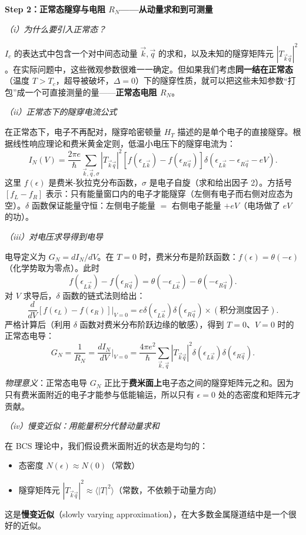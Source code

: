 \textbf{Step 2：正常态隧穿与电阻 $R_N$——从动量求和到可测量}

\textit{（i）为什么要引入正常态？}

$I_c$ 的表达式中包含一个对中间态动量 $\vec{k}, \vec{q}$ 的求和，以及未知的隧穿矩阵元 $|T_{\vec{k}\vec{q}}|^2$。在实际问题中，这些微观参数很难一一确定。但如果我们考虑\textbf{同一结在正常态}（温度 $T > T_c$，超导被破坏，$\Delta=0$）下的隧穿性质，就可以把这些未知参数``打包''成一个可直接测量的量——\textbf{正常态电阻 $R_N$}。

\textit{（ii）正常态下的隧穿电流公式}

在正常态下，电子不再配对，隧穿哈密顿量 $H_T$ 描述的是单个电子的直接隧穿。根据线性响应理论和费米黄金定则，低温小电压下的隧穿电流为：
\[
I_N(V) = \frac{2\pi e}{\hbar} \sum_{\vec{k},\vec{q},\sigma} |T_{\vec{k}\vec{q}}|^2 [f(\epsilon_{L\vec{k}}) - f(\epsilon_{R\vec{q}})] \delta(\epsilon_{L\vec{k}} - \epsilon_{R\vec{q}} - eV).
\]
这里 $f(\epsilon)$ 是费米-狄拉克分布函数，$\sigma$ 是电子自旋（求和给出因子 2）。方括号 $[f_L - f_R]$ 表示：只有能量窗口内的电子才能隧穿（左侧有电子而右侧对应态为空）。$\delta$ 函数保证能量守恒：左侧电子能量 $=$ 右侧电子能量 $+ eV$（电场做了 $eV$ 的功）。

\textit{（iii）对电压求导得到电导}

电导定义为 $G_N = dI_N/dV$。在 $T=0$ 时，费米分布是阶跃函数：$f(\epsilon) = \theta(-\epsilon)$（化学势取为零点）。此时
\[
f(\epsilon_{L\vec{k}}) - f(\epsilon_{R\vec{q}}) = \theta(-\epsilon_{L\vec{k}}) - \theta(-\epsilon_{R\vec{q}}).
\]
对 $V$ 求导后，$\delta$ 函数的链式法则给出：
\[
\frac{d}{dV}[f(\epsilon_L) - f(\epsilon_R)] \bigg|_{V=0} = e \delta(\epsilon_{L\vec{k}}) \delta(\epsilon_{R\vec{q}}) \times (\text{积分测度因子}).
\]
严格计算后（利用 $\delta$ 函数对费米分布阶跃边缘的敏感），得到 $T=0$、$V=0$ 时的正常态电导：
\[
G_N = \frac{1}{R_N} = \frac{dI_N}{dV}\bigg|_{V=0} = \frac{4\pi e^2}{\hbar} \sum_{\vec{k},\vec{q}} |T_{\vec{k}\vec{q}}|^2 \delta(\epsilon_{L\vec{k}}) \delta(\epsilon_{R\vec{q}}).
\]

\textit{物理意义}：正常态电导 $G_N$ 正比于\textbf{费米面上}电子态之间的隧穿矩阵元之和。因为只有费米面附近的电子才能参与低能输运，所以只有 $\epsilon=0$ 处的态密度和矩阵元才贡献。

\textit{（iv）慢变近似：用能量积分代替动量求和}

在 BCS 理论中，我们假设费米面附近的状态是均匀的：
\begin{itemize}[nosep]
    \item 态密度 $N(\epsilon) \approx N(0)$（常数）
    \item 隧穿矩阵元 $|T_{\vec{k}\vec{q}}|^2 \approx \langle |T|^2 \rangle$（常数，不依赖于动量方向）
\end{itemize}
这是\textbf{慢变近似}（slowly varying approximation），在大多数金属隧道结中是一个很好的近似。


